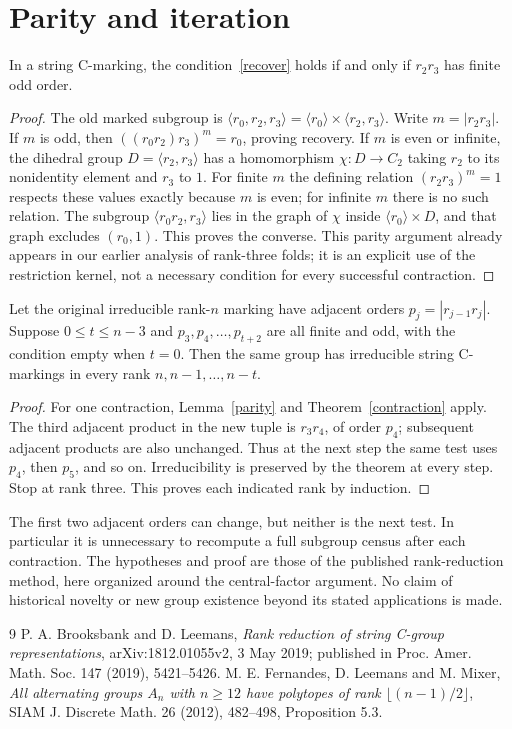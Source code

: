 \documentclass[a4paper,11pt]{article}
\newcommand{\gen}[1]{\langle#1\rangle}
\begin{document}
\section{Parity and iteration}
\begin{lemma}\label{parity}
In a string C-marking, the condition~\eqref{recover} holds if and only if
$r_2r_3$ has finite odd order.
\end{lemma}
\begin{proof}
The old marked subgroup is
$\gen{r_0,r_2,r_3}=\gen{r_0}\times\gen{r_2,r_3}$.
Write $m=|r_2r_3|$. If $m$ is odd, then
$((r_0r_2)r_3)^m=r_0$, proving recovery. If $m$ is even or infinite,
the dihedral group $D=\gen{r_2,r_3}$ has a homomorphism
$\chi:D\to C_2$ taking $r_2$ to its nonidentity element and $r_3$ to $1$.
For finite $m$ the defining relation $(r_2r_3)^m=1$ respects these values
exactly because $m$ is even; for infinite $m$ there is no such relation.
The subgroup $\gen{r_0r_2,r_3}$ lies in the graph of $\chi$ inside
$\gen{r_0}\times D$, and that graph excludes $(r_0,1)$. This proves the
converse. This parity argument already appears in our earlier analysis of
rank-three folds; it is an explicit use of the restriction kernel, not a
necessary condition for every successful contraction.
\end{proof}

\begin{corollary}\label{iterate}
Let the original irreducible rank-$n$ marking have adjacent orders
$p_j=|r_{j-1}r_j|$. Suppose $0\leq t\leq n-3$ and
$p_3,p_4,\ldots,p_{t+2}$ are all finite and odd, with the condition empty
when $t=0$. Then the same group has irreducible string C-markings in every
rank $n,n-1,\ldots,n-t$.
\end{corollary}
\begin{proof}
For one contraction, Lemma~\ref{parity} and Theorem~\ref{contraction}
apply. The third adjacent product in the new tuple is $r_3r_4$, of order
$p_4$; subsequent adjacent products are also unchanged. Thus at the next
step the same test uses $p_4$, then $p_5$, and so on. Irreducibility is
preserved by the theorem at every step. Stop at rank three. This proves
each indicated rank by induction.
\end{proof}
The first two adjacent orders can change, but neither is the next test.
In particular it is unnecessary to recompute a full subgroup census after
each contraction. The hypotheses and proof are those of the published
rank-reduction method, here organized around the central-factor argument.
No claim of historical novelty or new group existence beyond its stated
applications is made.

\begin{thebibliography}{9}
 P. A. Brooksbank and D. Leemans, \emph{Rank reduction of string
C-group representations}, arXiv:1812.01055v2, 3 May 2019; published in
Proc. Amer. Math. Soc. 147 (2019), 5421--5426.
 M. E. Fernandes, D. Leemans and M. Mixer, \emph{All alternating
groups $A_n$ with $n\geq12$ have polytopes of rank $\lfloor(n-1)/2\rfloor$},
SIAM J. Discrete Math. 26 (2012), 482--498, Proposition 5.3.
\end{thebibliography}
\end{document}
